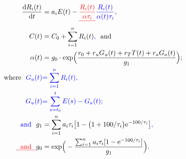 \documentclass[gmd, manuscript]{copernicus}
\providecommand{\DIFadd}[1]{{\protect\color{blue}#1}} %
\providecommand{\DIFdel}[1]{{\protect\color{red}\sout{#1}}}                      %
\providecommand{\DIFaddbegin}{} %
\providecommand{\DIFaddend}{} %
\providecommand{\DIFdelbegin}{} %
\providecommand{\DIFdelend}{} %
\begin{document}
\begin{align}
    \frac{\text{d}R_{i}(t)}{\text{d}t} &= a_{i}E(t) - \DIFdelbegin \DIFdel{\frac{R_{i}(t)}{\alpha \tau_{i}}}\DIFdelend \DIFaddbegin \DIFadd{\frac{R_{i}(t)}{\alpha(t) \tau_{i}}}\DIFaddend , \label{eq:gaspool}\\
    C(t) &= C_0 + \sum_{i=1}^{n}{R_{i}(t)}\DIFaddbegin \DIFadd{, }\DIFaddend \text{~~and~~} \label{eq:conc}\\
    \alpha(t) &= g_0 \cdot \text{exp}\Big(\frac{r_0 + r_uG_{u}(t) + r_TT(t) + r_aG_a(t)}{g_1}\Big); \label{eq:alpha}\\
    \text{~~where~~} \DIFaddbegin \DIFadd{G_a(t) }&\DIFadd{= \sum_{i=1}^{n}{R_{i}(t)}, }\nonumber\\
    \DIFadd{G_u(t) }&\DIFadd{= \sum^t_{s=t_0}{E(s)}-G_a(t); }\nonumber\\
    \DIFadd{\text{~~and~~}}\DIFaddend g_1 &= \sum_{i=1}^{n}{a_i\tau_i\big[1 - \big(1 + 100/\tau_i\big)\text{e}^{-100/\tau_i}\big]}\DIFaddbegin \DIFadd{, }\DIFaddend \nonumber\\
    \DIFdelbegin \DIFdel{\text{~~and~~}}\DIFdelend g_0 &= \text{exp} \Big( -\frac{ \sum_{i=1}^{n}{a_i \tau_i [1 - \text{e}^{-100/ \tau_i}]}}{g_1} \Big) . \nonumber
\end{align}\DIFaddbegin \\
\end{document}
